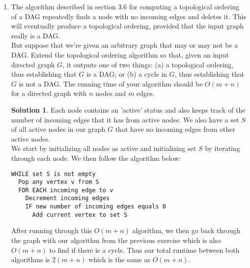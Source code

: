 \documentclass[12pt]{article}
\theoremstyle{definition}
\newtheorem*{solution}{Solution} %
\theoremstyle{plain}
\begin{document}
\begin{enumerate}
\item The algorithm described in section 3.6 for computing a topological ordering of a DAG repeatedly finds a node with no incoming edges and deletes it. This will eventually produce a topological ordering, provided that the input graph really is a DAG.\\
But suppose that we're given an arbitrary graph that may or may not be a DAG. Extend the topological ordering algorithm so that, given an input directed graph $G$, it outputs one of two things: (a) a topological ordering, thus establishing that $G$ is a DAG; or (b) a cycle in $G$, thus establishing that $G$ is not a DAG. The running time of your algorithm should be $O(m+n)$ for a directed graph with $n$ nodes and $m$ edges.\\
\begin{solution}
Each node contains an 'active' status and also keeps track of the number of incoming edges that it has from active nodes. We also have a set $S$ of all active nodes in our graph $G$ that have no incoming edges from other active nodes.\\
We start by initializing all nodes as active and initializing set $S$ by iterating through each node. We then follow the algorithm below:
\begin{verbatim}
WHILE set S is not empty
  Pop any vertex v from S
  FOR EACH incoming edge to v
    Decrement incoming edges
    IF new number of incoming edges equals 0
      Add current vertex to set S
\end{verbatim}
After running through this $O(m+n)$ algorithm, we then go back through the graph with our algorithm from the previous exercise which is also $O(m+n)$ to find if there is a cycle. Thus our total runtime between both algorithms is $2(m+n)$ which is the same as $O(m+n)$.
\end{solution}


\end{enumerate}
\end{document}
